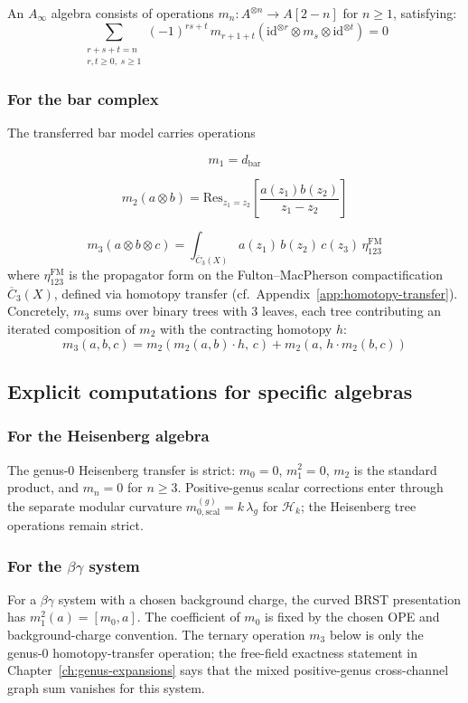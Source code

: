 An $A_\infty$ algebra consists of operations $m_n: A^{\otimes n} \to A[2-n]$ for $n \geq 1$, satisfying:
\[\sum_{\substack{r+s+t=n \\ r,t \geq 0,\; s \geq 1}} (-1)^{rs+t}\, m_{r+1+t}(\mathrm{id}^{\otimes r} \otimes m_s \otimes \mathrm{id}^{\otimes t}) = 0\]

\subsubsection{For the bar complex}

The transferred bar model carries operations

\[m_1 = d_{\text{bar}}\]

\[m_2(a \otimes b) = \text{Res}_{z_1=z_2}\left[\frac{a(z_1)b(z_2)}{z_1-z_2}\right]\]

\[m_3(a \otimes b \otimes c) = \int_{\overline{C}_3(X)} a(z_1)\, b(z_2)\, c(z_3)\, \eta_{123}^{\text{FM}}\]
where $\eta_{123}^{\text{FM}}$ is the propagator form on the Fulton--MacPherson compactification $\overline{C}_3(X)$, defined via homotopy transfer (cf.\ Appendix~\ref{app:homotopy-transfer}). Concretely, $m_3$ sums over binary trees with 3 leaves, each tree contributing an iterated composition of $m_2$ with the contracting homotopy $h$:
\[m_3(a, b, c) = m_2(m_2(a, b) \cdot h,\, c) + m_2(a,\, h \cdot m_2(b, c))\]

\subsection{Explicit computations for specific algebras}

\subsubsection{For the Heisenberg algebra}

The genus-$0$ Heisenberg transfer is strict: $m_0=0$,
$m_1^2=0$, $m_2$ is the standard product, and $m_n=0$ for
$n\geq 3$.  Positive-genus scalar corrections enter through the
separate modular curvature
$m_{0,\mathrm{scal}}^{(g)}=k\,\lambda_g$ for
$\mathcal H_k$; the Heisenberg tree operations remain strict.

\subsubsection{\texorpdfstring{For the $\beta\gamma$ system}{For the beta-gamma system}}

For a $\beta\gamma$ system with a chosen background charge, the curved
BRST presentation has $m_1^2(a)=[m_0,a]$.  The coefficient of $m_0$
is fixed by the chosen OPE and background-charge convention.  The
ternary operation $m_3$ below is only the genus-$0$ homotopy-transfer
operation; the free-field exactness statement in
Chapter~\ref{ch:genus-expansions} says that the mixed positive-genus
cross-channel graph sum vanishes for this system.


